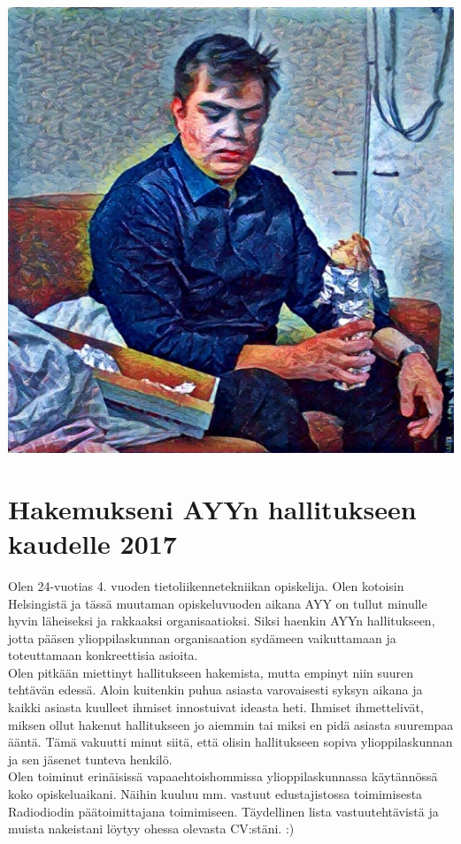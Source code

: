 \documentclass[a4paper, 12pt, finnish]{report}
\newcommand{\topic}{Hakemukseni AYYn hallitukseen kaudelle 2017}
\begin{document}
\includegraphics{Onni.jpg}
\section*{\topic}

Olen 24-vuotias 4. vuoden tietoliikennetekniikan opiskelija.
Olen kotoisin Helsingistä ja tässä muutaman opiskeluvuoden aikana AYY on tullut minulle hyvin läheiseksi ja rakkaaksi organisaatioksi.
Siksi haenkin AYYn hallitukseen, jotta pääsen ylioppilaskunnan organisaation sydämeen vaikuttamaan ja toteuttamaan konkreettisia asioita.\\

Olen pitkään miettinyt hallitukseen hakemista, mutta empinyt niin suuren tehtävän edessä.
Aloin kuitenkin puhua asiasta varovaisesti syksyn aikana ja kaikki asiasta kuulleet ihmiset innostuivat ideasta heti.
Ihmiset ihmettelivät, miksen ollut hakenut hallitukseen jo aiemmin tai miksi en pidä asiasta suurempaa ääntä.
Tämä vakuutti minut siitä, että olisin hallitukseen sopiva ylioppilaskunnan ja sen jäsenet tunteva henkilö.\\

Olen toiminut erinäisissä vapaaehtoishommissa ylioppilaskunnassa käytännössä koko opiskeluaikani.
Näihin kuuluu mm. vastuut edustajistossa toimimisesta Radiodiodin päätoimittajana toimimiseen.
Täydellinen lista vastuutehtävistä ja muista nakeistani löytyy ohessa olevasta CV:stäni. :)\\
\end{document}
